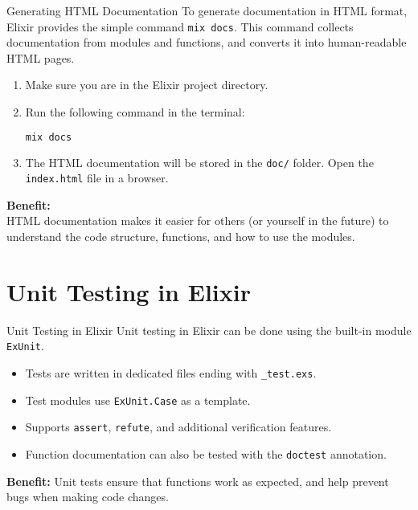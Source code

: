 \documentclass[aspectratio=169, table]{beamer}
\begin{document}
\begin{frame}[fragile]{Generating HTML Documentation}
\vspace{15pt}
To generate documentation in HTML format,  
Elixir provides the simple command \texttt{mix docs}.  
This command collects documentation from modules and functions,  
and converts it into human-readable HTML pages.

\begin{enumerate}
  \item Make sure you are in the Elixir project directory.  
  \item Run the following command in the terminal:  
\begin{lstlisting}[language=bash]
mix docs
\end{lstlisting}
  \item The HTML documentation will be stored in the \texttt{doc/} folder.  
        Open the \texttt{index.html} file in a browser.  
\end{enumerate}
\vspace{5pt}
\textbf{Benefit:}\\
HTML documentation makes it easier for others (or yourself in the future)  
to understand the code structure, functions, and how to use the modules.  
\end{frame}

\section{Unit Testing in Elixir}

\begin{frame}{Unit Testing in Elixir}
\vspace{15pt}
Unit testing in Elixir can be done using the built-in module  
\texttt{ExUnit}.  

\begin{itemize}
  \item Tests are written in dedicated files ending with \texttt{\_test.exs}.  
  \item Test modules use \texttt{ExUnit.Case} as a template.  
  \item Supports \texttt{assert}, \texttt{refute}, and additional verification features.  
  \item Function documentation can also be tested with the \texttt{doctest} annotation.  
\end{itemize}

\vspace{5pt}
\textbf{Benefit:} Unit tests ensure that functions work as expected,  
and help prevent bugs when making code changes.  
\end{frame}
\end{document}
